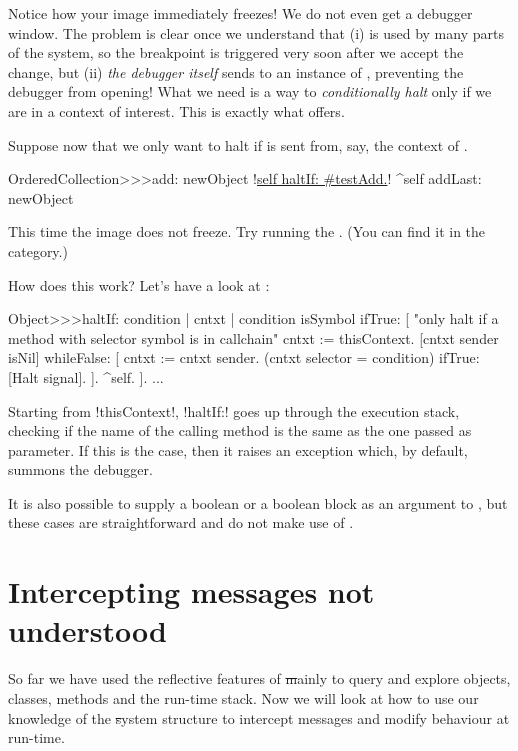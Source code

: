 \documentclass[a4paper,10pt,twoside]{book}
\begin{document}
Notice how your image immediately freezes!  We do not even get a debugger window.
The problem is clear once we understand that (i)  is used by many parts of the system, so the breakpoint is triggered very soon after we accept the change, but (ii) \emph{the debugger itself} sends  to an instance of , preventing the debugger from opening!
What we need is a way to \emph{conditionally halt} only if we are in a context of interest.
This is exactly what  offers.

Suppose now that we only want to halt if  is sent from, say, the context of .

\begin{code}{}
OrderedCollection>>>add: newObject
	!\underline{self haltIf: \#testAdd.}!
	^self addLast: newObject
\end{code}

This time the image does not freeze. Try running the .
(You can find it in the  category.)

How does this work?  Let's have a look at :
\begin{code}{}
Object>>>haltIf: condition
	| cntxt |
	condition isSymbol ifTrue: [
		"only halt if a method with selector symbol is in callchain"
		cntxt := thisContext.
		[cntxt sender isNil] whileFalse: [
			cntxt := cntxt sender. 
			(cntxt selector = condition) ifTrue: [Halt signal]. ].
		^self.
	].
	...
\end{code}

Starting from \ct!thisContext!, \ct!haltIf:! goes up through the execution stack, checking if the name of the calling method is the same as the one passed as parameter.
If this is the case, then it raises an exception which, by default, summons the debugger.

It is also possible to supply a boolean or a boolean block as an argument to , but these cases are straightforward and do not make use of .

\section{Intercepting messages not understood}
\label{sec:msgnotunderstood}

So far we have used the reflective features of \st mainly to query and explore objects, classes, methods and the run-time stack. Now we will look at how to use our knowledge of the \st system structure to intercept messages and modify behaviour at run-time.
\end{document}
